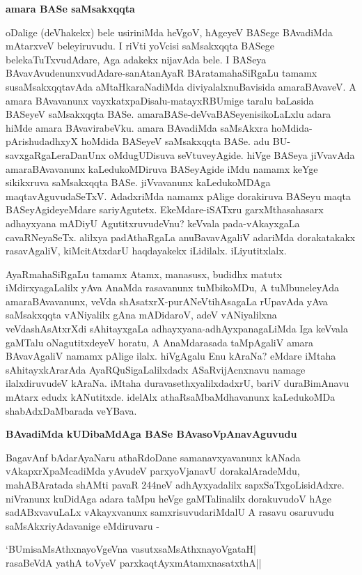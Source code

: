 \textbf{amara BASe saMsakxqqta}

oDalige (deVhakekx) bele usiriniMda heVgoV, hAgeyeV BASege BAvadiMda mAtarxveV beleyiruvudu. I riVti yoVcisi saMsakxqqta BASege belekaTuTxvudAdare, Aga adakekx nijavAda bele. I BASeya BAvavAvudenunxvudAdare-sanAtanAyaR BAratamahaSiRgaLu tamamx susaMsakxqqtavAda aMtaHkaraNadiMda diviyalalxnuBavisida amaraBAvaveV. A amara BAvavanunx vayxkatxpaDisalu-matayxRBUmige taralu baLasida BASeyeV saMsakxqqta BASe. amaraBASe-deVvaBASeyenisikoLaLxlu adara hiMde amara BAvavirabeVku. amara BAvadiMda saMsAkxra hoMdida-pArishudadhxyX hoMdida BASeyeV saMsakxqqta BASe. adu BU-savxgaRgaLeraDanUnx oMdugUDisuva seVtuveyAgide. hiVge BASeya jiVvavAda amaraBAvavanunx kaLedukoMDiruva BASeyAgide iMdu namamx keYge sikikxruva saMsakxqqta BASe. jiVvavanunx kaLedukoMDAga maqtavAguvudaSeTxV. AdadxriMda namamx pAlige dorakiruva BASeyu maqta BASeyAgideyeMdare sariyAgutetx. EkeMdare-iSATxru garxMthasahasarx adhayxyana mADiyU AgutitxruvudeVnu? keVvala pada-vAkayxgaLa cavaRNeyaSeTx. alilxya padAthaRgaLa anuBavavAgaliV adariMda dorakatakakx rasavAgaliV, kiMcitAtxdarU haqdayakekx iLidilalx. iLiyutitxlalx. 

AyaRmahaSiRgaLu tamamx Atamx, manasusx, budidhx matutx iMdirxyagaLalilx yAva AnaMda rasavanunx tuMbikoMDu, A tuMbuneleyAda amaraBAvavanunx, veVda shAsatxrX-purANeVtihAsagaLa rUpavAda yAva saMsakxqqta vANiyalilx gAna mADidaroV, adeV vANiyalilxna veVdashAsAtxrXdi sAhitayxgaLa adhayxyana-adhAyxpanagaLiMda Iga keVvala gaMTalu oNagutitxdeyeV horatu, A AnaMdarasada taMpAgaliV amara BAvavAgaliV namamx pAlige ilalx. hiVgAgalu Enu kAraNa? eMdare iMtaha sAhitayxkArarAda AyaRQuSigaLalilxdadx ASaRvijAcnxnavu namage ilalxdiruvudeV kAraNa. iMtaha duravasethxyalilxdadxrU, bariV duraBimAnavu mAtarx edudx kANutitxde. idelAlx athaRsaMbaMdhavanunx kaLedukoMDa shabAdxDaMbarada veYBava.

\textbf{BAvadiMda kUDibaMdAga BASe BAvasoVpAnavAguvudu}

BagavAnf bAdarAyaNaru athaRdoDane samanavxyavanunx kANada vAkapxrXpaMcadiMda yAvudeV parxyoVjanavU dorakalAradeMdu, mahABAratada shAMti pavaR 244neV adhAyxyadalilx sapxSaTxgoLisidAdxre. niVranunx kuDidAga adara taMpu heVge gaMTalinalilx dorakuvudoV hAge sadABxvavuLaLx vAkayxvanunx samxrisuvudariMdalU A rasavu osaruvudu saMsAkxriyAdavanige eMdiruvaru -

\begin{shloka}
`BUmisaMsAthxnayoVgeVna vasutxsaMsAthxnayoVgataH|\\
rasaBeVdA yathA toVyeV parxkaqtAyxmAtamxnasatxthA||\\
\end{shloka}


